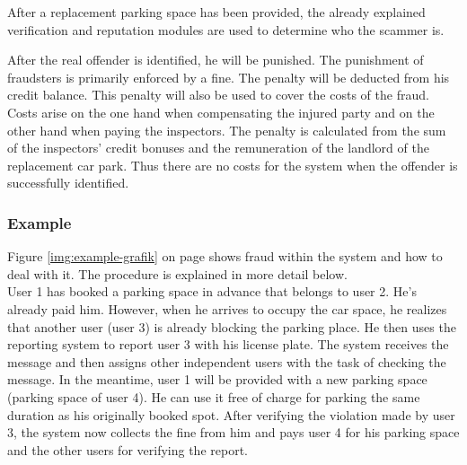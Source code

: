 \documentclass[
a4paper,     %
titlepage,   %
14pt         %
]{scrartcl}  %
\theoremstyle{mystyle}
\begin{document}
After a replacement parking space has been provided, the already explained verification and reputation modules are used to determine who the scammer is.

After the real offender is identified, he will be punished. The punishment of fraudsters is primarily enforced by a fine. The penalty will be deducted from his credit balance. This penalty will also be used to cover the costs of the fraud. Costs arise on the one hand when compensating the injured party and on the other hand when paying the inspectors. The penalty is calculated from the sum of the inspectors' credit bonuses and the remuneration of the landlord of the replacement car park. Thus there are no costs for the system when the offender is successfully identified.

\subsubsection{Example}
Figure \ref{img:example-grafik} on page \pageref{img:example-grafik} shows fraud within the system and how to deal with it. The procedure is explained in more detail below.\\

User 1 has booked a parking space in advance that belongs to user 2. He's already paid him. However, when he arrives to occupy the car space, he realizes that another user (user 3) is already blocking the parking place. He then uses the reporting system to report user 3 with his license plate. The system receives the message and then assigns other independent users with the task of checking the message. In the meantime, user 1 will be provided with a new parking space (parking space of user 4). He can use it free of charge for parking the same duration as his originally booked spot. After verifying the violation made by user 3, the system now collects the fine from him and pays user 4 for his parking space and the other users for verifying the report.\\
\end{document}
